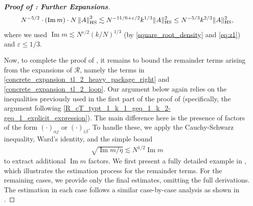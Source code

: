 \documentclass[10pt,reqno]{amsart}
\numberwithin{equation}{section}
\numberwithin{figure}{section}
\theoremstyle{plain} %
\theoremstyle{definition} %
\renewcommand{\txt}[1]{\text{\rm{#1}}}
\newcommand{\cR}{{\mathcal R}}
\newcommand{\cE}{{\mathcal{E}}}
\renewcommand{\leq}{\le}
\newcommand{\pa}[1]{\left({#1}\right)}
\newcommand{\norm}[1]{\lVert #1 \rVert}
\newcommand{\norma}[1]{\left\lVert #1 \right\rVert}
\DeclareMathOperator{\im}{\mathrm{Im}}
\newcommand{\e}{{\varepsilon}}
\newcommand{\HS}{\txt{HS}}
\numberwithin{equation}{section}
\begin{document}
\begin{proof}[\bf Proof of : Further Expansions]
        \begin{equation}\nonumber
            \begin{aligned}
                N^{-5/2}\cdot (\im m)\cdot N\norma{A}_{\HS}^2\lesssim N^{-11/6+\varepsilon/2}k^{1/3}\norm{A}_{\HS}^2\leq N^{-5/3}k^{2/3}\norm{A}_{\HS}^2,
            \end{aligned}
        \end{equation}
        where we used $\im m\lesssim N^{\e/2}(k/N)^{1/3}$ (by \eqref{square_root_density} and \eqref{eq:z1}) and $\e\le 1/3$.

\medspace

 Now, to complete the proof of , it remains to bound the remainder terms arising from the expansions of $\cR$, namely the terms \smash{$\cE_{\cR}^{\pa{2}}$} in \eqref{concrete_expansion_tl_2_heavy_package_right} and \eqref{concrete_expansion_tl_2_loop}. 
 Our argument below again relies on the inequalities previously used in the first part of the proof of  (specifically, the argument following \eqref{R_cT_typt_1_k_1_geq_1_k_2-geq_1_explicit_expression}). 
 The main difference here is the presence of factors of the form $\pa{\cdot}_{\alpha j}$ or $\pa{\cdot}_{i \beta}$. To handle these, we apply the Cauchy-Schwarz inequality, Ward's identity, and the simple bound 
    \begin{equation}\label{light_weights_to_im_m}
        \begin{aligned}
            \sqrt{{\im m}/{\eta}}\lesssim N^{1/2}\im m
        \end{aligned}
    \end{equation}
to extract additional $\im m$ factors. We first present a fully detailed example in  , which illustrates the estimation process for the remainder terms. For the remaining cases, we provide only the final estimates, omitting the full derivations. The estimation in each case follows a similar case-by-case analysis as shown in .




\end{proof}
\end{document}
